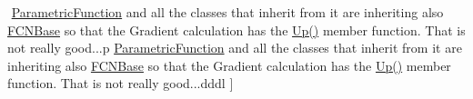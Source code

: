 \begin{DoxyRefList}
{{$${{$$%
\mbox{\hyperlink{classROOT_1_1Minuit2_1_1ParametricFunction}{Parametric\+Function}} and all the classes that inherit from it are inheriting also \mbox{\hyperlink{classROOT_1_1Minuit2_1_1FCNBase}{F\+C\+N\+Base}} so that the Gradient calculation has the \mbox{\hyperlink{classROOT_1_1Minuit2_1_1FCNBase_a04ef08ddad92ce8d89d498efbe021c39}{Up()}} member function. That is not really good...p \label{todo__todo000036}%
%
\mbox{\hyperlink{classROOT_1_1Minuit2_1_1ParametricFunction}{Parametric\+Function}} and all the classes that inherit from it are inheriting also \mbox{\hyperlink{classROOT_1_1Minuit2_1_1FCNBase}{F\+C\+N\+Base}} so that the Gradient calculation has the \mbox{\hyperlink{classROOT_1_1Minuit2_1_1FCNBase_a04ef08ddad92ce8d89d498efbe021c39}{Up()}} member function. That is not really good...dddl }}}}]
\end{DoxyRefList}